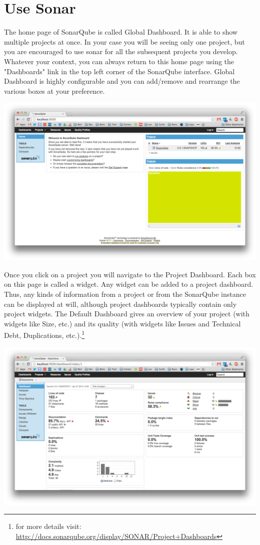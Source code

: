 \documentclass{article}
\newif\ifinstall
\begin{document}
\ifinstall
\else

\section{Use Sonar}

The home page of SonarQube is called Global Dashboard. It is able to
show multiple projects at once. In your case you will be seeing only
one project, but you are encouraged to use sonar for all the
subsequent projects you develop. Whatever your context, you can
always return to this home page using the "Dashboards" link in the top
left corner of the SonarQube interface. Global Dashboard is highly
configurable and you can add/remove and rearrange the various boxes at
your preference. 
\begin{center}
\includegraphics[scale=0.3]{figures/ss1.png}
\end{center}


Once you click on a project you will navigate to the Project Dashboard. 
Each box on this page is called a widget. Any widget can be added to a
project dashboard. Thus, any kinds of information from a project or
from the SonarQube instance can be displayed at will, although project
dashboards typically contain only project widgets.
The Default Dashboard gives an overview of your project (with widgets
like Size, etc.) and its quality (with widgets like Issues and
Technical Debt, Duplications, etc.).\footnote{for more details visit: \url{http://docs.sonarqube.org/display/SONAR/Project+Dashboards}}
\begin{center}
\includegraphics[scale=0.3]{figures/ss2.png}
\end{center}
\end{document}
